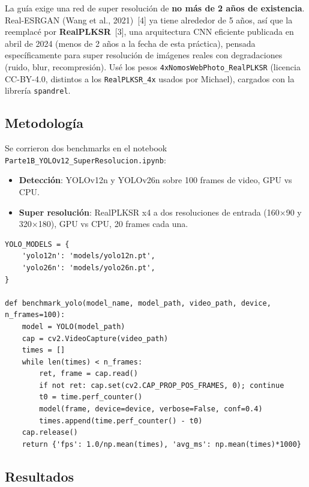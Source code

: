 \documentclass[12pt,a4paper]{article}
\let\oldsubsection\subsection
\renewcommand{\subsection}[1]{\needspace{5\baselineskip}\oldsubsection{#1}}
\begin{document}
La guía exige una red de super resolución de \textbf{no más de 2 años de existencia}. Real-ESRGAN (Wang et al., 2021)~[4] ya tiene alrededor de 5 años, así que la reemplacé por \textbf{RealPLKSR}~[3], una arquitectura CNN eficiente publicada en abril de 2024 (menos de 2 años a la fecha de esta práctica), pensada específicamente para super resolución de imágenes reales con degradaciones (ruido, blur, recompresión). Usé los pesos \texttt{4xNomosWebPhoto\_RealPLKSR} (licencia CC-BY-4.0, distintos a los \texttt{RealPLKSR\_4x} usados por Michael), cargados con la librería \texttt{spandrel}.

\subsection{Metodología}

Se corrieron dos benchmarks en el notebook \texttt{Parte1B\_YOLOv12\_SuperResolucion.ipynb}:

\begin{itemize}
  \item \textbf{Detección}: YOLOv12n y YOLOv26n sobre 100 frames de video, GPU vs CPU.
  \item \textbf{Super resolución}: RealPLKSR x4 a dos resoluciones de entrada (160×90 y 320×180), GPU vs CPU, 20 frames cada una.
\end{itemize}

\begin{lstlisting}[style=pystyle]
YOLO_MODELS = {
    'yolo12n': 'models/yolo12n.pt',
    'yolo26n': 'models/yolo26n.pt',
}

def benchmark_yolo(model_name, model_path, video_path, device, n_frames=100):
    model = YOLO(model_path)
    cap = cv2.VideoCapture(video_path)
    times = []
    while len(times) < n_frames:
        ret, frame = cap.read()
        if not ret: cap.set(cv2.CAP_PROP_POS_FRAMES, 0); continue
        t0 = time.perf_counter()
        model(frame, device=device, verbose=False, conf=0.4)
        times.append(time.perf_counter() - t0)
    cap.release()
    return {'fps': 1.0/np.mean(times), 'avg_ms': np.mean(times)*1000}
\end{lstlisting}

\subsection{Resultados}
\end{document}
